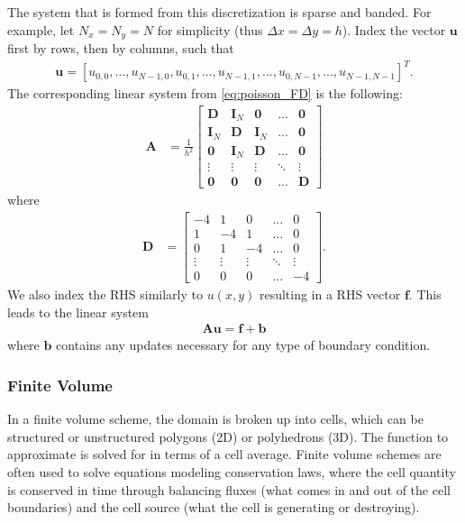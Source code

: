 The system that is formed from this discretization is sparse and banded. For example, let $N_x = N_y = N$ for simplicity (thus $\Delta x = \Delta y = h$). Index the vector $\textbf{u}$ first by rows, then by columns, such that
\begin{align}
    \textbf{u} = [u_{0,0}, ..., u_{N - 1, 0}, u_{0, 1}, ..., u_{N - 1, 1}, ..., u_{0, N - 1}, ..., u_{N - 1, N - 1}]^T.
\end{align}
The corresponding linear system from \ref{eq:poisson_FD} is the following:
\begin{align}
    \textbf{A} &= \frac{1}{h^2}
    \begin{bmatrix}
        \textbf{D} & \textbf{I}_{N} & \textbf{0} & ... & \textbf{0} \\
        \textbf{I}_{N} & \textbf{D} & \textbf{I}_{N} & ... & \textbf{0} \\
        \textbf{0} & \textbf{I}_{N} & \textbf{D} & ... & \textbf{0} \\
        \vdots & \vdots & \vdots & \ddots & \vdots \\
        \textbf{0} & \textbf{0} & \textbf{0} & ... & \textbf{D}
    \end{bmatrix}
\end{align}
where
\begin{align}
    \textbf{D} &= 
    \begin{bmatrix}
        -4 & 1 & 0 & ... & 0 \\
        1 & -4 & 1 & ... & 0 \\
        0 & 1 & -4 & ... & 0 \\
        \vdots & \vdots & \vdots & \ddots & \vdots \\
        0 & 0 & 0 & ... & -4
    \end{bmatrix}.
\end{align}
We also index the RHS similarly to $u(x,y)$ resulting in a RHS vector $\textbf{f}$. This leads to the linear system
\begin{align}
    \textbf{A} \textbf{u} = \textbf{f} + \textbf{b}
\end{align}
where $\textbf{b}$ contains any updates necessary for any type of boundary condition.

\subsubsection{Finite Volume}

In a finite volume scheme, the domain is broken up into cells, which can be structured or unstructured polygons (2D) or polyhedrons (3D). The function to approximate is solved for in terms of a cell average. Finite volume schemes are often used to solve equations modeling conservation laws, where the cell quantity is conserved in time through balancing fluxes (what comes in and out of the cell boundaries) and the cell source (what the cell is generating or destroying).

